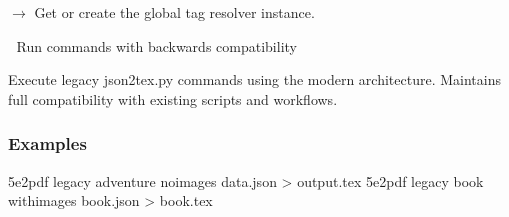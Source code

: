 \documentclass[letterpaper,10pt,english]{sphinxmanual}
\begin{document}

\begin{fulllineitems}
\label{\detokenize{api/cli:src.cli.main.get_tag_resolver}}
\pysigstartsignatures
\pysiglinewithargsret
{}
{}
{{ $\rightarrow$ {\hyperref[\detokenize{api/core:src.core.indexer.tag_resolver.TagResolver}]{}}}}
\pysigstopsignatures
\sphinxAtStartPar
Get or create the global tag resolver instance.

\end{fulllineitems}


\begin{fulllineitems}
\label{\detokenize{api/cli:src.cli.main.legacy_mode}}
\pysigstartsignatures
\pysiglinewithargsret
{}
{}
{}
\pysigstopsignatures
\sphinxAtStartPar
🔄  \sphinxhyphen{} Run commands with backwards compatibility

\sphinxAtStartPar
Execute legacy json2tex.py commands using the modern architecture.
Maintains full compatibility with existing scripts and workflows.
\subsubsection*{Examples}

\sphinxAtStartPar
5e2pdf legacy \textendash{}adventure \textendash{}no\sphinxhyphen{}images data.json \textgreater{} output.tex
5e2pdf legacy \textendash{}book \textendash{}with\sphinxhyphen{}images book.json \textgreater{} book.tex

\end{fulllineitems}

\end{document}
